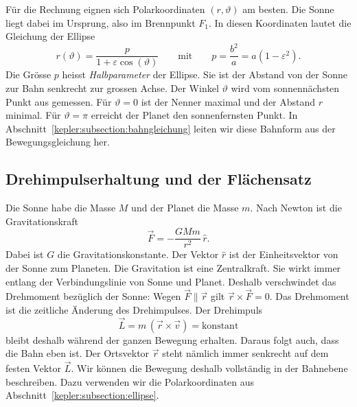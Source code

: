 Für die Rechnung eignen sich Polarkoordinaten $(r,\vartheta)$ am besten.
%
Die Sonne liegt dabei im Ursprung, also im Brennpunkt $F_1$.
%
In diesen Koordinaten lautet die Gleichung der Ellipse
\begin{equation}
r(\vartheta)
=
\frac{p}{1+\varepsilon\cos(\vartheta)}
\qquad\text{mit}\qquad
p
=
\frac{b^2}{a}
=
a(1-\varepsilon^2).
\label{kepler:eqn:ellipse}
\end{equation}
Die Grösse $p$ heisst \emph{Halbparameter} der Ellipse.
%
%
Sie ist der Abstand von der Sonne zur Bahn senkrecht zur grossen Achse.
Der Winkel $\vartheta$ wird vom sonnennächsten Punkt aus gemessen.
Für $\vartheta=0$ ist der Nenner maximal und der Abstand $r$ minimal.
Für $\vartheta=\pi$ erreicht der Planet den sonnenfernsten Punkt.
In Abschnitt~\ref{kepler:subsection:bahngleichung} leiten wir diese
Bahnform aus der Bewegungsgleichung her.

\subsection{Drehimpulserhaltung und der Flächensatz
\label{kepler:subsection:flaechensatz}}

Die Sonne habe die Masse $M$ und der Planet die Masse $m$.
Nach Newton \cite{kepler:principia} ist die Gravitationskraft
\begin{equation}
\vec{F}
=
-\frac{GMm}{r^2}\,\hat{r}.
\label{kepler:eqn:gravitation}
\end{equation}
Dabei ist $G$ die Gravitationskonstante.
Der Vektor $\hat{r}$ ist der Einheitsvektor von der Sonne zum Planeten.
Die Gravitation ist eine Zentralkraft.
%
Sie wirkt immer entlang der Verbindungslinie von Sonne und Planet.
Deshalb verschwindet das Drehmoment bezüglich der Sonne: Wegen
$\vec{F}\parallel\vec{r}$ gilt $\vec{r}\times\vec{F}=0$.
Das Drehmoment ist die zeitliche Änderung des Drehimpulses.
%
Der Drehimpuls
%
\begin{equation}
\vec{L}
=
m\,(\vec{r}\times\vec{v})
=
\text{konstant}
\label{kepler:eqn:drehimpulsvektor}
\end{equation}
bleibt deshalb während der ganzen Bewegung erhalten.
Daraus folgt auch, dass die Bahn eben ist.
Der Ortsvektor $\vec{r}$ steht nämlich immer senkrecht auf dem festen Vektor $\vec{L}$.
Wir können die Bewegung deshalb vollständig in der Bahnebene beschreiben.
%
Dazu verwenden wir die Polarkoordinaten aus Abschnitt~\ref{kepler:subsection:ellipse}.

